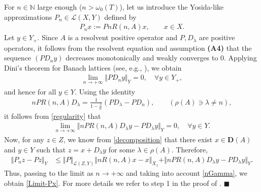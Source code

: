 \documentclass[onecolumn]{autart}
\def\la{\lambda}
\def\calL{{\mathcal{L}}}
\def\N{\mathbb N}
\numberwithin{equation}{section}
\newenvironment{proof}{{\it Proof: \enspace}}{\hfill $\blacksquare$\par}
\begin{document}
	\begin{proof}
		For $n \in \N$ large enough ($n>\omega_0(T)$), let us introduce the Yosida-like approximations $P_n \in \mathcal{L}(X,Y)$ defined by
		\begin{align*}
			P_n x:=P n R(n,A)x,\qquad x\in X.
		\end{align*}
		Let $y\in Y_+$. Since $A$ is a resolvent positive operator and $P,D_\la$ are positive operators, it follows from the resolvent equation and assumption {\bf (A4)} that the sequence $(P D_{n}y)$ decreases monotonically and weakly converges to $0$. Applying Dini's theorem for Banach lattices (see, e.g., \cite[Prop. 10.9]{BFR}), we obtain
		\begin{align}\label{regularity}
			\lim_{n\to +\infty } \Vert P D_{n}y\Vert_Y=0, \quad \forall y\in Y_+,
		\end{align}
		and hence for all $y\in Y$.
        Using the identity
		\begin{align*}
			nP R(n,A) D_\la =\frac{1}{1-\frac{\la}{n}}(P D_\la-P D_n),\qquad (\rho(A)\ni\la\neq n),
		\end{align*}
		it follows from \eqref{regularity} that
		\begin{align}\label{nGamma}
			\lim_{n \to +\infty} \Vert n P R(n,A) D_\la y-P D_\la y \Vert_{Y}= 0, \quad \forall y\in Y.
		\end{align}
		Now, for any $z\in Z$, we know from \eqref{decomposition} that there exist $x\in {\bm D}(A)$ and $y\in Y$ such that $z=x+D_{\la}y$ for some $\lambda\in\rho(A)$. Therefore,
		\begin{align*}
			\Vert P_n z-P z\Vert_{Y}%
			&\le \Vert P\Vert_{\calL(Z,Y)} \Vert n R(n,A)x- x\Vert_{X_1}+\Vert n P R(n,A) D_\la y-P D_\la y\Vert_{Y}.
		\end{align*}
		Thus, passing to the limit as $n\to +\infty$ and taking into account \eqref{nGamma}, we obtain \eqref{Limit-Px}. For more details we refer to step 1 in the proof of \cite[Thm. 2]{Yassine}.
	\end{proof}
	
\end{document}
